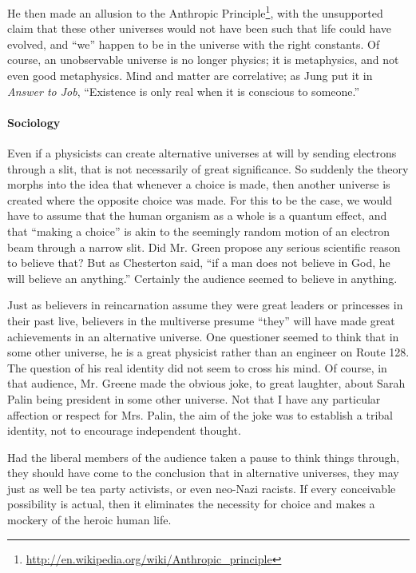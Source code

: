 He then made an allusion to the Anthropic Principle\footnote{\url{http://en.wikipedia.org/wiki/Anthropic_principle}}, with the unsupported claim that these other universes would not have been such that life could have evolved, and ``we'' happen to be in the universe with the right constants. Of course, an unobservable universe is no longer physics; it is metaphysics, and not even good metaphysics. Mind and matter are correlative; as Jung put it in \emph{Answer to Job}, ``Existence is only real when it is conscious to someone.''

\paragraph{Sociology}


Even if a physicists can create alternative universes at will by sending electrons through a slit, that is not necessarily of great significance. So suddenly the theory morphs into the idea that whenever a choice is made, then another universe is created where the opposite choice was made. For this to be the case, we would have to assume that the human organism as a whole is a quantum effect, and that ``making a choice'' is akin to the seemingly random motion of an electron beam through a narrow slit. Did Mr. Green propose any serious scientific reason to believe that? But as Chesterton said, ``if a man does not believe in God, he will believe an anything.'' Certainly the audience seemed to believe in anything.

Just as believers in reincarnation assume they were great leaders or princesses in their past live, believers in the multiverse presume ``they'' will have made great achievements in an alternative universe. One questioner seemed to think that in some other universe, he is a great physicist rather than an engineer on Route 128. The question of his real identity did not seem to cross his mind. Of course, in that audience, Mr. Greene made the obvious joke, to great laughter, about Sarah Palin being president in some other universe. Not that I have any particular affection or respect for Mrs. Palin, the aim of the joke was to establish a tribal identity, not to encourage independent thought.

Had the liberal members of the audience taken a pause to think things through, they should have come to the conclusion that in alternative universes, they may just as well be tea party activists, or even neo-Nazi racists. If every conceivable possibility is actual, then it eliminates the necessity for choice and makes a mockery of the heroic human life.


